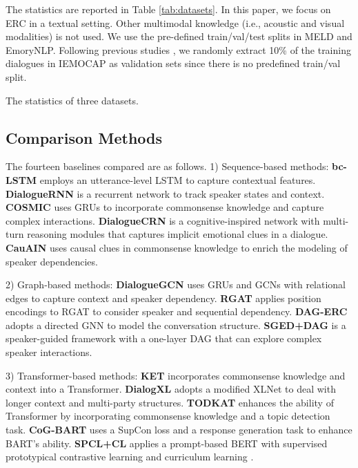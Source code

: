 \documentclass[11pt]{article}
\begin{document}
The statistics are reported in Table \ref{tab:datasets}. In this paper, we focus on ERC in a textual setting. Other multimodal knowledge (i.e., acoustic and visual modalities) is not used.
We use the pre-defined train/val/test splits in MELD and EmoryNLP.
Following previous studies \cite{DBLP:conf/naacl/HazarikaPZCMZ18,DBLP:conf/emnlp/GhosalMPCG19}, we randomly extract 10\% of the training dialogues in IEMOCAP as validation sets since there is no predefined train/val split.

\begin{table}[t]
\centering  
\resizebox{\linewidth}{!}{}
  \caption{The statistics of three datasets. }
  \label{tab:datasets}
\end{table}


\subsection{Comparison Methods}
The fourteen baselines compared are as follows.
1) Sequence-based methods:
\textbf{bc-LSTM} \cite{DBLP:conf/acl/PoriaCHMZM17}
employs an utterance-level LSTM to capture contextual features.
\textbf{DialogueRNN} \cite{DBLP:conf/aaai/MajumderPHMGC19} 
is a recurrent network to track speaker states and context.
\textbf{COSMIC} \cite{DBLP:conf/emnlp/GhosalMGMP20} 
uses GRUs to incorporate commonsense knowledge and capture complex interactions.
\textbf{DialogueCRN} \cite{DBLP:conf/acl/HuWH20} 
is a cognitive-inspired network with multi-turn reasoning modules that captures implicit emotional clues in a dialogue.
\textbf{CauAIN}  \cite{DBLP:conf/ijcai/ZhaoZL22}
uses causal clues in commonsense knowledge to enrich the modeling of speaker dependencies.

2) Graph-based methods:
\textbf{DialogueGCN} \cite{DBLP:conf/emnlp/GhosalMPCG19} 
uses GRUs and GCNs with relational edges to capture context and speaker dependency.
\textbf{RGAT} \cite{DBLP:conf/emnlp/IshiwatariYMG20} 
applies position encodings to RGAT to consider speaker and sequential dependency. 
\textbf{DAG-ERC} \cite{DBLP:conf/acl/ShenWYQ20} 
adopts a directed GNN to model the conversation structure.
\textbf{SGED+DAG} \cite{DBLP:conf/ijcai/BaoMWZH22} 
is a speaker-guided framework with a one-layer DAG that can explore complex speaker interactions.

3) Transformer-based methods:
\textbf{KET} \cite{DBLP:conf/emnlp/ZhongWM19} 
incorporates commonsense knowledge and context into a Transformer.
\textbf{DialogXL} \cite{DBLP:conf/aaai/ShenCQX21} 
adopts a modified XLNet to deal with longer context and multi-party structures.
\textbf{TODKAT} \cite{DBLP:conf/acl/ZhuP0ZH20} enhances the ability of Transformer by incorporating commonsense knowledge and a topic detection task.
\textbf{CoG-BART} \cite{DBLP:conf/aaai/LiYQ22}
uses a SupCon loss \cite{khosla2020supervised} and a response generation task to enhance BART's ability.
\textbf{SPCL+CL} \cite{DBLP:conf/emnlp/SongXH22}
applies a prompt-based BERT with supervised prototypical contrastive learning \cite{DBLP:conf/cvpr/00230W0W21,lopez2022supervised} and curriculum learning \cite{DBLP:conf/icml/BengioLCW09}.
\end{document}
